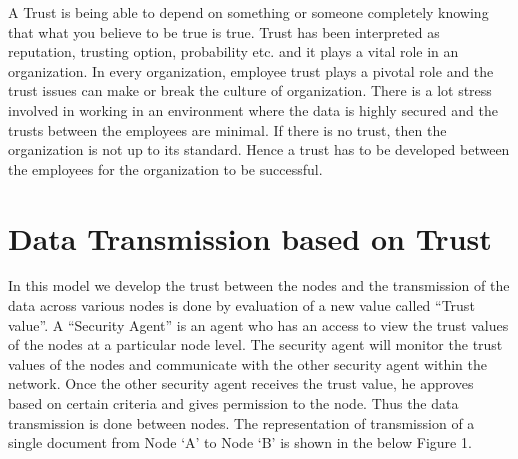 \label{sec:trust-management}
A Trust is being able to depend on something or someone completely knowing that
what you believe to be true is true. Trust has been interpreted as reputation,
trusting option, probability etc. \autocite{Liu2006} and it plays a vital role in an
organization.  In every organization, employee trust plays a pivotal role and
the trust issues can make or break the culture of organization. There is a lot
stress involved in working in an environment where the data is highly secured
and the trusts between the employees are minimal.  If there is no trust, then
the organization is not up to its standard. Hence a trust has to be developed
between the employees for the organization to be successful. 

\section{Data Transmission based on Trust}
In this model we develop the trust between the nodes and the transmission of the
data across various nodes is done by evaluation of a new value called “Trust
value”. A “Security Agent” is an agent who has an access to view the trust
values of the nodes at a particular node level. The security agent will monitor
the trust values of the nodes and communicate with the other security agent
within the network. Once the other security agent receives the trust value, he
approves based on certain criteria and gives permission to the node. Thus the
data transmission is done between nodes. The representation of transmission of
a single document from Node ‘A' to Node ‘B' is shown in the below Figure 1.


